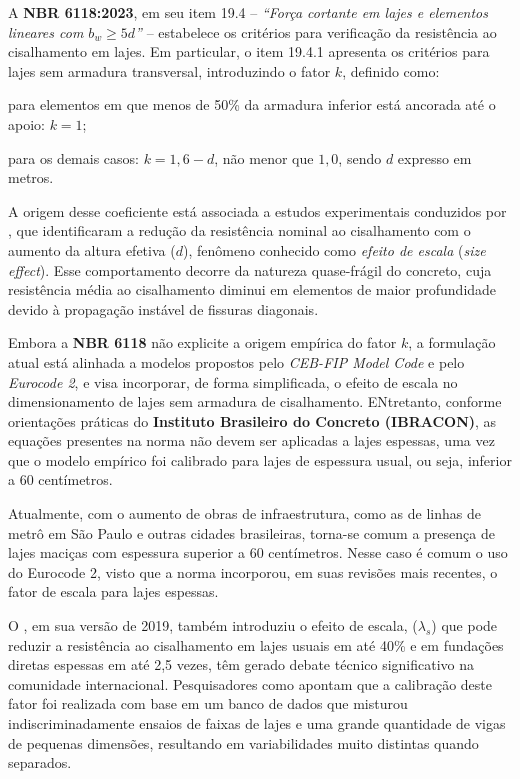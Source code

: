 A \textbf{NBR 6118:2023}, em seu item 19.4 -- \textit{“Força cortante em lajes e elementos lineares com $b_w \geq 5d$”} -- estabelece os critérios para verificação da resistência ao cisalhamento em lajes. Em particular, o item 19.4.1 apresenta os critérios para lajes sem armadura transversal, introduzindo o fator $k$, definido como:

\begin{alineas}
    \item para elementos em que menos de 50\% da armadura inferior está ancorada até o apoio: $k = 1$;
    \item para os demais casos: $k = 1{,}6 - d$, não menor que $1{,}0$, sendo $d$ expresso em metros.
\end{alineas}

A origem desse coeficiente está associada a estudos experimentais conduzidos por \textcite{Hedman1975shear}, que identificaram a redução da resistência nominal ao cisalhamento com o aumento da altura efetiva ($d$), fenômeno conhecido como \textit{efeito de escala} (\textit{size effect}). Esse comportamento decorre da natureza quase-frágil do concreto, cuja resistência média ao cisalhamento diminui em elementos de maior profundidade devido à propagação instável de fissuras diagonais.

Embora a \textbf{NBR 6118} não explicite a origem empírica do fator $k$, a formulação atual está alinhada a modelos propostos pelo \textit{CEB-FIP Model Code} e pelo \textit{Eurocode 2}, e visa incorporar, de forma simplificada, o efeito de escala no dimensionamento de lajes sem armadura de cisalhamento. ENtretanto, conforme orientações práticas do \textbf{Instituto Brasileiro do Concreto (IBRACON)}, as equações presentes na norma não devem ser aplicadas a lajes espessas, uma vez que o modelo empírico foi calibrado para lajes de espessura usual, ou seja, inferior a 60 centímetros.

Atualmente, com o aumento de obras de infraestrutura, como as de linhas de metrô em São Paulo e outras cidades brasileiras, torna-se comum a presença de lajes maciças com espessura superior a 60 centímetros. Nesse caso é comum o uso do Eurocode 2, visto que a norma incorporou, em suas revisões mais recentes, o fator de escala para lajes espessas. 

O \textcite{ACI318:2019}, em sua versão de 2019, também introduziu o efeito de escala, (\(\lambda_s\)) que pode reduzir a resistência ao cisalhamento em lajes usuais em até 40\% e em fundações diretas espessas em até 2,5 vezes, têm gerado debate técnico significativo na comunidade internacional. Pesquisadores como \textcite{Marquesi2021} apontam que a calibração deste fator foi realizada com base em um banco de dados que misturou indiscriminadamente ensaios de faixas de lajes e uma grande quantidade de vigas de pequenas dimensões, resultando em variabilidades muito distintas quando separados.

